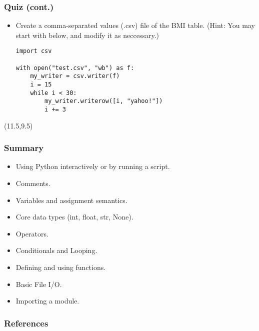 \documentclass{beamer}
\begin{document}
\begin{frame}[fragile]
\frametitle{Quiz (cont.)}
\begin{itemize}
\item Create a comma-separated values (.csv) file
    of the BMI table. (Hint: You may start with below,
    and modify it as neccessary.) 
\begin{lstlisting}
import csv

with open("test.csv", "wb") as f:
    my_writer = csv.writer(f)
    i = 15
    while i < 30:
        my_writer.writerow([i, "yahoo!"])
        i += 3 
\end{lstlisting}
\end{itemize}

\begin{textblock}{5}(11.5,9.5)
\end{textblock}

\end{frame}

\begin{frame}[fragile]
\frametitle{Summary}
\begin{itemize}
\item Using Python interactively or by running a script.
\item Comments.
\item Variables and assignment semantics.
\item Core data types (int, float, str, None).
\item Operators.
\item Conditionals and Looping.
\item Defining and using functions.
\item Basic File I/O.
\item Importing a module.
\end{itemize}
\end{frame}

\begin{frame}%
  \frametitle{References}
  
  \scriptsize
  
\end{frame}
\end{document}
